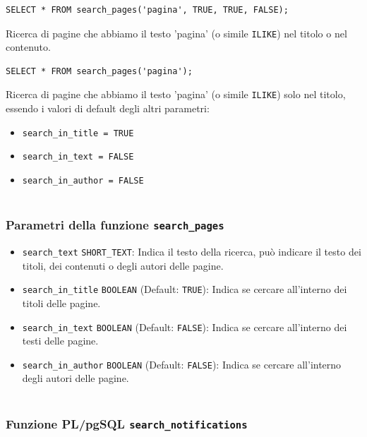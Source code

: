 \documentclass{article}
\begin{document}
\begin{lstlisting}[style=SQL]
SELECT * FROM search_pages('pagina', TRUE, TRUE, FALSE);
\end{lstlisting}
Ricerca di pagine che abbiamo il testo 'pagina' (o simile \texttt{ILIKE}) nel titolo o nel contenuto.
\\
\begin{lstlisting}[style=SQL]
SELECT * FROM search_pages('pagina');
\end{lstlisting}
Ricerca di pagine che abbiamo il testo 'pagina' (o simile \texttt{ILIKE}) solo nel titolo, essendo i valori di default degli altri parametri:
\begin{itemize}
	\item \texttt{search\_in\_title = TRUE}
	\item \texttt{search\_in\_text = FALSE}
	\item \texttt{search\_in\_author = FALSE} 
	\\\\
\end{itemize}

	
\subsubsection{Parametri della funzione \texttt{search\_pages}}	
	\begin{itemize}
		\item \texttt{search\_text} \texttt{SHORT\_TEXT}: Indica il testo della ricerca, può indicare il testo dei titoli, dei contenuti o degli autori delle pagine.
		\item \texttt{search\_in\_title} \texttt {BOOLEAN} (Default: \texttt{TRUE}): Indica se cercare all'interno dei titoli delle pagine.
		\item \texttt{search\_in\_text} \texttt {BOOLEAN} (Default: \texttt{FALSE}): Indica se cercare all'interno dei testi delle pagine.
		\item \texttt{search\_in\_author} \texttt {BOOLEAN} (Default: \texttt{FALSE}): Indica se cercare all'interno degli autori delle pagine.
		\\\\
	\end{itemize}
	
\newpage
	
\subsubsection{Funzione PL/pgSQL \texttt{search\_notifications}}
\end{document}
